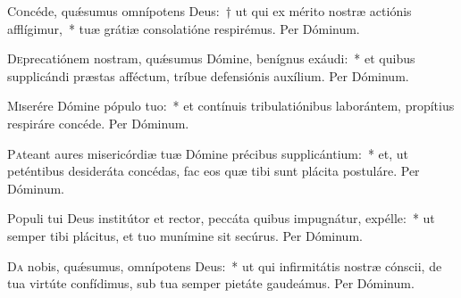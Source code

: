\documentclass[vesperale_romanum.tex]{subfiles}
\begin{document}
\oratio

\lettrine{C}{o}ncéde, quǽsumus omnípotens Deus:~† ut qui ex mérito nostræ actiónis afflígimur,~* tuæ grátiæ consolatióne respirémus.
Per Dóminum.






\oratio

\lettrine{D}{e}precatiónem nostram, quǽsumus Dómine, benígnus exáudi:~* et quibus supplicándi præstas affé\-ctum, tríbue defensiónis auxílium. Per Dóminum.



\oratio

\lettrine{M}{i}serére Dómine pópulo tuo:~* et contínuis tribulatiónibus laborántem, propítius respiráre concéde. Per Dóminum.



\oratio

\lettrine{P}{a}teant aures misericórdiæ tuæ Dómine précibus supplicántium:~* et, ut peténtibus desideráta concédas, fac eos quæ tibi sunt plácita postuláre.
Per Dóminum.



\oratio

\lettrine{P}{o}puli tui Deus institútor et rector, peccáta quibus impugnátur, expélle:~* ut semper tibi plácitus, et tuo munímine sit secúrus. Per Dóminum.



\oratio

\lettrine{D}{a}  nobis, quǽsumus, omnípotens Deus:~* ut qui infirmitátis nostræ cónscii, de tua virtúte confídimus, sub tua semper pietáte gaudeámus.
Per Dóminum.
\end{document}
